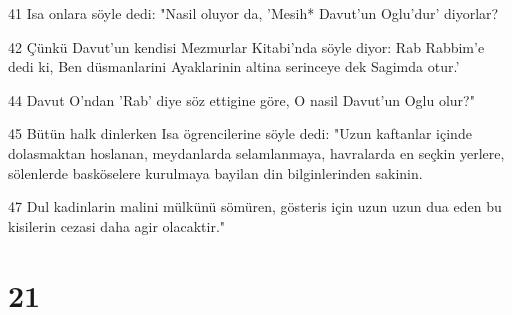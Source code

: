 \par 41 Isa onlara söyle dedi: "Nasil oluyor da, 'Mesih* Davut'un Oglu'dur' diyorlar?
\par 42 Çünkü Davut'un kendisi Mezmurlar Kitabi'nda söyle diyor: Rab Rabbim'e dedi ki, Ben düsmanlarini Ayaklarinin altina serinceye dek Sagimda otur.'
\par 44 Davut O'ndan 'Rab' diye söz ettigine göre, O nasil Davut'un Oglu olur?"
\par 45 Bütün halk dinlerken Isa ögrencilerine söyle dedi: "Uzun kaftanlar içinde dolasmaktan hoslanan, meydanlarda selamlanmaya, havralarda en seçkin yerlere, sölenlerde basköselere kurulmaya bayilan din bilginlerinden sakinin.
\par 47 Dul kadinlarin malini mülkünü sömüren, gösteris için uzun uzun dua eden bu kisilerin cezasi daha agir olacaktir."

\chapter{21}

